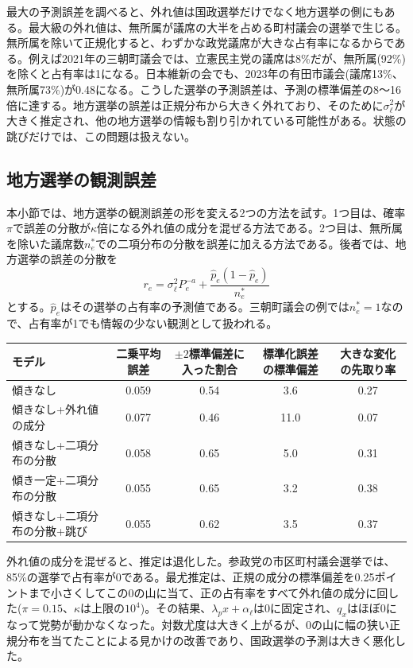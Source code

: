 \documentclass[a4paper,11pt]{ltjsarticle}
\begin{document}
最大の予測誤差を調べると、外れ値は国政選挙だけでなく地方選挙の側にもある。最大級の外れ値は、無所属が議席の大半を占める町村議会の選挙で生じる。無所属を除いて正規化すると、わずかな政党議席が大きな占有率になるからである。例えば2021年の三朝町議会では、立憲民主党の議席は8\%だが、無所属(92\%)を除くと占有率は1になる。日本維新の会でも、2023年の有田市議会(議席13\%、無所属73\%)が0.48になる。こうした選挙の予測誤差は、予測の標準偏差の8〜16倍に達する。地方選挙の誤差は正規分布から大きく外れており、そのために$\sigma_\ell^2$が大きく推定され、他の地方選挙の情報も割り引かれている可能性がある。状態の跳びだけでは、この問題は扱えない。

\subsection{地方選挙の観測誤差}
\label{sec:localerr}

本小節では、地方選挙の観測誤差の形を変える2つの方法を試す。1つ目は、確率$\pi$で誤差の分散が$\kappa$倍になる外れ値の成分を混ぜる方法である。2つ目は、無所属を除いた議席数$n^\ast_e$での二項分布の分散を誤差に加える方法である。後者では、地方選挙の誤差の分散を
\begin{equation}
  r_e = \sigma_\ell^2P_e^{-a} + \frac{\hat p_e(1-\hat p_e)}{n^\ast_e}
\end{equation}
とする。$\hat p_e$はその選挙の占有率の予測値である。三朝町議会の例では$n^\ast_e=1$なので、占有率が1でも情報の少ない観測として扱われる。

\begin{table}[h]
\centering
\begin{tabular}{lcccc}
\hline
モデル & 二乗平均誤差 & $\pm2$標準偏差に入った割合 & 標準化誤差の標準偏差 & 大きな変化の先取り率 \\
\hline
傾きなし & 0.059 & 0.54 & 3.6 & 0.27 \\
傾きなし+外れ値の成分 & 0.077 & 0.46 & 11.0 & 0.07 \\
傾きなし+二項分布の分散 & 0.058 & 0.65 & 5.0 & 0.31 \\
傾き一定+二項分布の分散 & 0.055 & 0.65 & 3.2 & 0.38 \\
傾きなし+二項分布の分散+跳び & 0.055 & 0.62 & 3.5 & 0.37 \\
\hline
\end{tabular}
\end{table}

外れ値の成分を混ぜると、推定は退化した。参政党の市区町村議会選挙では、85\%の選挙で占有率が0である。最尤推定は、正規の成分の標準偏差を0.25ポイントまで小さくしてこの0の山に当て、正の占有率をすべて外れ値の成分に回した($\pi=0.15$、$\kappa$は上限の$10^4$)。その結果、$\lambda_px+\alpha_\ell$は0に固定され、$q_x$はほぼ0になって党勢が動かなくなった。対数尤度は大きく上がるが、0の山に幅の狭い正規分布を当てたことによる見かけの改善であり、国政選挙の予測は大きく悪化した。
\end{document}
